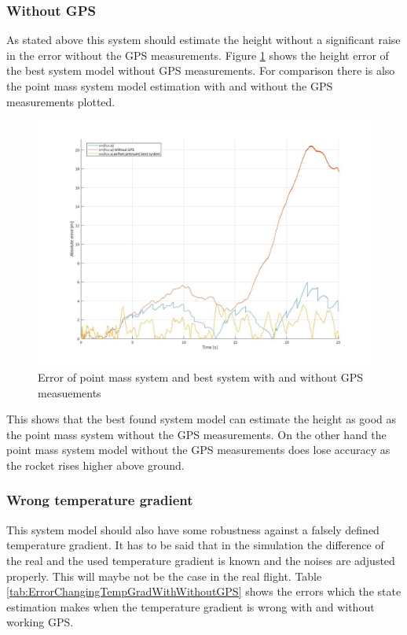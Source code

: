 \subsubsection{Without GPS}
As stated above this system should estimate the height without a significant raise in the error without the GPS measurements.
Figure \ref{fig:ErrorWitoutGPS} shows the height error of the best system model without GPS measurements.
For comparison there is also the point mass system model estimation with and without the GPS measurements plotted.

\begin{figure}[h!]
 \centering
 \includegraphics[width=.8\textwidth]{./Pictures/ErrorPointMassBestSystemWithoutGPS.jpg}
 \caption{Error of point mass system and best system with and without GPS measuements}
 \label{fig:ErrorWitoutGPS}
\end{figure}

This shows that the best found system model can estimate the height as good as the point mass system without the GPS measurements.
On the other hand the point mass system model without the GPS measurements does lose accuracy as the rocket rises higher above ground.

\subsubsection{Wrong temperature gradient}
This system model should also have some robustness against a falsely defined temperature gradient.
It has to be said that in the simulation the difference of the real and the used temperature gradient is known and the noises are adjusted properly.
This will maybe not be the case in the real flight.
Table \ref{tab:ErrorChangingTempGradWithWithoutGPS} shows the errors which the state estimation makes when the temperature gradient is wrong with and without working GPS.

